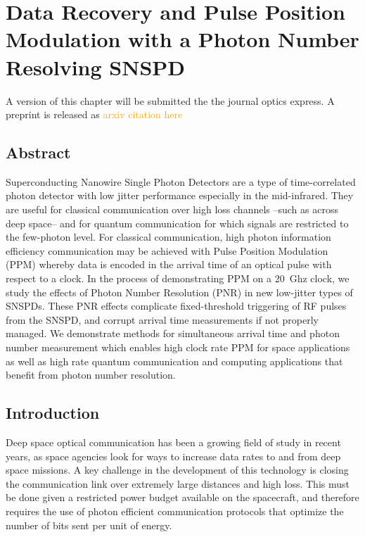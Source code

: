 \documentclass[11pt]{caltech_thesis} %
\begin{document}
\hypertarget{data-recovery-and-pulse-position-modulation-with-a-photon-number-resolving-snspd}{%
\chapter{Data Recovery and Pulse Position Modulation with a Photon Number Resolving SNSPD}\label{data-recovery-and-pulse-position-modulation-with-a-photon-number-resolving-snspd}}

A version of this chapter will be submitted the the journal optics express. A preprint is released as \textcolor{orange}{arxiv citation here}

\hypertarget{abstract-2}{%
\section{Abstract}\label{abstract-2}}

Superconducting Nanowire Single Photon Detectors are a type of time-correlated photon detector with low jitter performance especially in the mid-infrared. They are useful for classical communication over high loss channels --such as across deep space-- and for quantum communication for which signals are restricted to the few-photon level. For classical communication, high photon information efficiency communication may be achieved with Pulse Position Modulation (PPM) whereby data is encoded in the arrival time of an optical pulse with respect to a clock. In the process of demonstrating PPM on a 20~Ghz clock, we study the effects of Photon Number Resolution (PNR) in new low-jitter types of SNSPDs. These PNR effects complicate fixed-threshold triggering of RF pulses from the SNSPD, and corrupt arrival time measurements if not properly managed. We demonstrate methods for simultaneous arrival time and photon number measurement which enables high clock rate PPM for space applications as well as high rate quantum communication and computing applications that benefit from photon number resolution.

\hypertarget{introduction-3}{%
\section{Introduction}\label{introduction-3}}

Deep space optical communication has been a growing field of study in recent years, as space agencies look for ways to increase data rates to and from deep space missions. A key challenge in the development of this technology is closing the communication link over extremely large distances and high loss. This must be done given a restricted power budget available on the spacecraft, and therefore requires the use of photon efficient communication protocols that optimize the number of bits sent per unit of energy.
\end{document}

